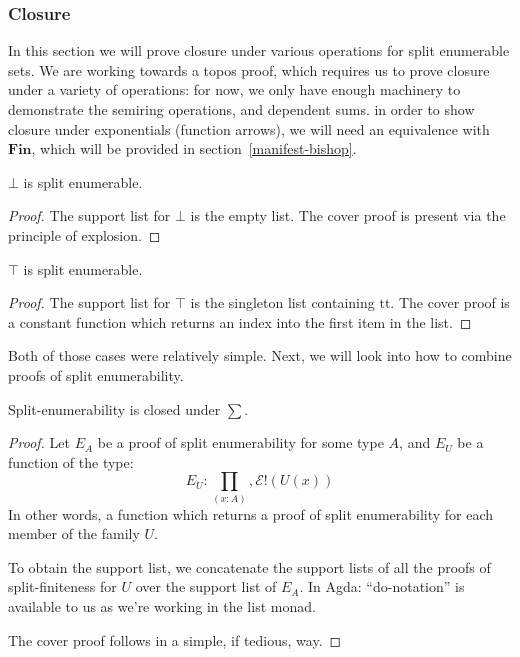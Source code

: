 \subsubsection{Closure}
In this section we will prove closure under various operations for split
enumerable sets.
We are working towards a topos proof, which requires us to prove closure under
a variety of operations: for now, we only have enough machinery to demonstrate
the semiring operations, and dependent sums.
in order to show closure under exponentials (function arrows), we will need an
equivalence with \(\mathbf{Fin}\), which will be provided in
section~\ref{manifest-bishop}.
\begin{lemma}
  \(\bot\) is split enumerable.
\end{lemma}
\begin{proof}
  The support list for \(\bot\) is the empty list.
  The cover proof is present via the principle of explosion.
\end{proof}
\begin{lemma}
  \(\top\) is split enumerable.
\end{lemma}
\begin{proof}
  The support list for \(\top\) is the singleton list containing \(\text{tt}\).
  The cover proof is a constant function which returns an index into the first
  item in the list.
\end{proof}
Both of those cases were relatively simple.
Next, we will look into how to combine proofs of split enumerability.
\begin{theorem}
  Split-enumerability is closed under \(\sum\).
\end{theorem}
\begin{proof}
  Let \(E_A\) be a proof of split enumerability for some type \(A\), and \(E_U\)
  be a function of the type:
  \begin{equation}
    E_U : \prod_{(x : A)} , \mathcal{E}!(U(x))
  \end{equation}
  In other words, a function which returns a proof of split enumerability for
  each member of the family \(U\).

  To obtain the support list, we concatenate the support lists of all the proofs
  of split-finiteness for \(U\) over the support list of \(E_A\).
  In Agda:
  ``do-notation'' is available to us as we're working in the list monad.

  The cover proof follows in a simple, if tedious, way.
\end{proof}
